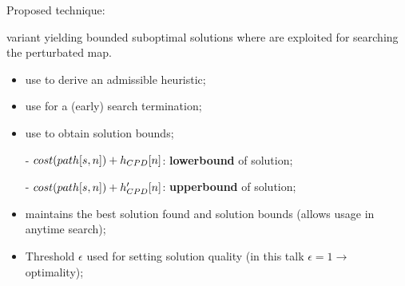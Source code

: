 \begin{frame}{Proposed technique: \CPDSearch{}}
    \begin{block}{\CPDSearch{}}
        \A{} variant yielding bounded suboptimal solutions where \CPDPathsName{} are exploited for searching the perturbated map.
    \end{block}

    \begin{itemize}
        \item {\color{gray}use \CPD{} to derive an admissible heuristic;}
        \item {\color{gray}use \CPD{} for a (early) search termination;}
        \item {use \CPD{} to obtain solution bounds;}
    \end{itemize}

    \begin{itemize}
        \item[-] $\pathCostOnGraph{s}{n} + \CPDPathCostOriginal{n}{t}$: \textbf{lowerbound} of solution;
        \item[-] $\pathCostOnGraph{s}{n} + \CPDPathCostNew{n}{t}$: \textbf{upperbound} of solution;
    \end{itemize}

    \begin{block}{}
        \begin{itemize}
            \item \CPDSearch{} maintains the best solution found and solution bounds (allows usage in anytime search);
            \item Threshold $\epsilon$ used for setting \CPDSearch{} solution quality (in this talk $\epsilon = 1 \rightarrow $ optimality);
        \end{itemize}
    \end{block}

\end{frame}

